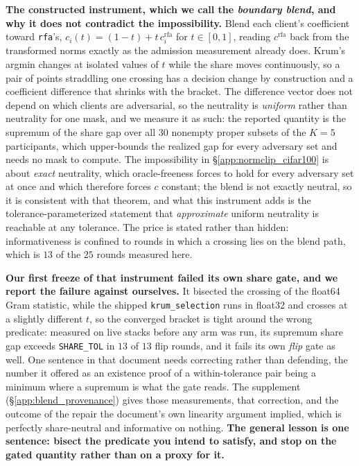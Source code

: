 \documentclass{article}
\begin{document}
\textbf{The constructed instrument, which we call the \emph{boundary blend}, and why it does not contradict the impossibility.} Blend each client's coefficient toward \texttt{rfa}'s, $c_i(t) = (1-t) + t\,c_i^{\mathrm{rfa}}$ for $t\in[0,1]$, reading $c^{\mathrm{rfa}}$ back from the transformed norms exactly as the admission measurement already does. Krum's argmin changes at isolated values of $t$ while the share moves continuously, so a pair of points straddling one crossing has a decision change by construction and a coefficient difference that shrinks with the bracket. The difference vector does not depend on which clients are adversarial, so the neutrality is \emph{uniform} rather than neutrality for one mask, and we measure it as such: the reported quantity is the supremum of the share gap over all $30$ nonempty proper subsets of the $K{=}5$ participants, which upper-bounds the realized gap for every adversary set and needs no mask to compute. The impossibility in §\ref{app:normclip_cifar100} is about \emph{exact} neutrality, which oracle-freeness forces to hold for every adversary set at once and which therefore forces $c$ constant; the blend is not exactly neutral, so it is consistent with that theorem, and what this instrument adds is the tolerance-parameterized statement that \emph{approximate} uniform neutrality is reachable at any tolerance. The price is stated rather than hidden: informativeness is confined to rounds in which a crossing lies on the blend path, which is $13$ of the $25$ rounds measured here.

\textbf{Our first freeze of that instrument failed its own share gate, and we report the failure against ourselves.} It bisected the crossing of the float64 Gram statistic, while the shipped \texttt{krum\_selection} runs in float32 and crosses at a slightly different $t$, so the converged bracket is tight around the wrong predicate: measured on live stacks before any arm was run, its supremum share gap exceeds \texttt{SHARE\_TOL} in $13$ of $13$ flip rounds, and it fails its own \emph{flip} gate as well. One sentence in that document needs correcting rather than defending, the number it offered as an existence proof of a within-tolerance pair being a minimum where a supremum is what the gate reads. The supplement (§\ref{app:blend_provenance}) gives those measurements, that correction, and the outcome of the repair the document's own linearity argument implied, which is perfectly share-neutral and informative on nothing. \textbf{The general lesson is one sentence: bisect the predicate you intend to satisfy, and stop on the gated quantity rather than on a proxy for it.}
\end{document}
